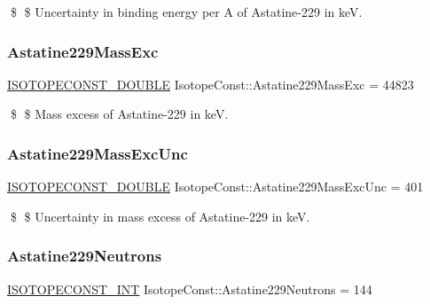 \$ \$ Uncertainty in binding energy per A of Astatine-\/229 in keV. \mbox{\label{group___isotope_const-_astatine-_at229_gade4a10083ffae75b5da76a80e8b998df}} 
\subsubsection{\texorpdfstring{Astatine229\+Mass\+Exc}{Astatine229MassExc}}
{\footnotesize\ttfamily \mbox{\hyperlink{group___isotope_const-_macros_ga8f45a7272ce02c0b4c65c44636ed719a}{I\+S\+O\+T\+O\+P\+E\+C\+O\+N\+S\+T\+\_\+\+D\+O\+U\+B\+LE}} Isotope\+Const\+::\+Astatine229\+Mass\+Exc = 44823}

\$ \$ Mass excess of Astatine-\/229 in keV. \mbox{\label{group___isotope_const-_astatine-_at229_ga5a4bbc9490000f07ac2c716bb543b409}} 
\subsubsection{\texorpdfstring{Astatine229\+Mass\+Exc\+Unc}{Astatine229MassExcUnc}}
{\footnotesize\ttfamily \mbox{\hyperlink{group___isotope_const-_macros_ga8f45a7272ce02c0b4c65c44636ed719a}{I\+S\+O\+T\+O\+P\+E\+C\+O\+N\+S\+T\+\_\+\+D\+O\+U\+B\+LE}} Isotope\+Const\+::\+Astatine229\+Mass\+Exc\+Unc = 401}

\$ \$ Uncertainty in mass excess of Astatine-\/229 in keV. \mbox{\label{group___isotope_const-_astatine-_at229_ga4a49482d39bfe137251ccff28e0791d3}} 
\subsubsection{\texorpdfstring{Astatine229\+Neutrons}{Astatine229Neutrons}}
{\footnotesize\ttfamily \mbox{\hyperlink{group___isotope_const-_macros_ga5f18360b3e99483a35c32d789e62621c}{I\+S\+O\+T\+O\+P\+E\+C\+O\+N\+S\+T\+\_\+\+I\+NT}} Isotope\+Const\+::\+Astatine229\+Neutrons = 144}

